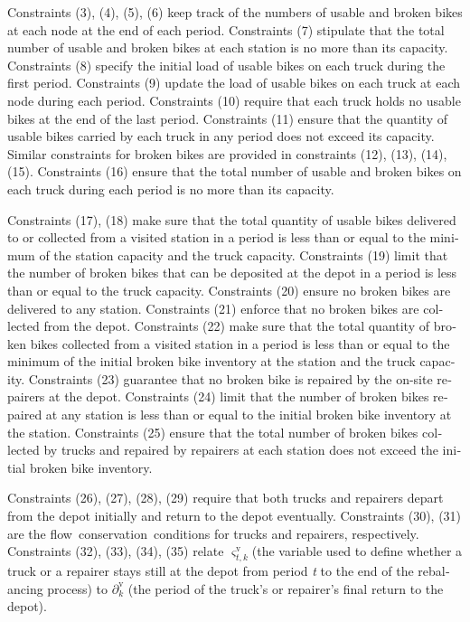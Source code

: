 \documentclass[
  english,
]{article}
\begin{document}
\begin{otherlanguage}{english}
\protect{}\label{p0225}
Constraints (3), (4), (5), (6) keep track of the numbers of usable and broken bikes at each node at
the end of each period. Constraints (7) stipulate that the total number of usable and broken bikes
at each station is no more than its capacity. Constraints (8) specify the initial load of usable
bikes on each truck during the first period. Constraints (9) update the load of usable bikes on each
truck at each node during each period. Constraints (10) require that each truck holds no usable
bikes at the end of the last period. Constraints (11) ensure that the quantity of usable bikes
carried by each truck in any period does not exceed its capacity. Similar constraints for broken
bikes are provided in constraints (12), (13), (14), (15). Constraints (16) ensure that the total
number of usable and broken bikes on each truck during each period is no more than its capacity.

\protect{}\label{p0230}
Constraints (17), (18) make sure that the total quantity of usable bikes delivered to or collected
from a visited station in a period is less than or equal to the minimum of the station capacity and
the truck capacity. Constraints (19) limit that the number of broken bikes that can be deposited at
the depot in a period is less than or equal to the truck capacity. Constraints (20) ensure no broken
bikes are delivered to any station. Constraints (21) enforce that no broken bikes are collected from
the depot. Constraints (22) make sure that the total quantity of broken bikes collected from a
visited station in a period is less than or equal to the minimum of the initial broken bike
inventory at the station and the truck capacity. Constraints (23) guarantee that no broken bike is
repaired by the on-site repairers at the depot. Constraints (24) limit that the number of broken
bikes repaired at any station is less than or equal to the initial broken bike inventory at the
station. Constraints (25) ensure that the total number of broken bikes collected by trucks and
repaired by repairers at each station does not exceed the initial broken bike inventory.

\protect{}\label{p0235}
Constraints (26), (27), (28), (29) require that both trucks and repairers depart from the depot
initially and return to the depot eventually. Constraints (30), (31) are the
flow~conservation~conditions for trucks and repairers, respectively. Constraints (32), (33), (34),
(35) relate \(\varsigma_{t,k}^{\text{v}}\)(the variable used to define whether a truck or a repairer stays
still at the depot from period \emph{t} to the end of the rebalancing process) to
\(\partial_{k}^{\text{v}}\) (the period of the truck's or repairer's final return to the depot).


\end{otherlanguage}
\end{document}

